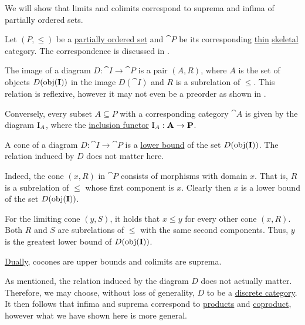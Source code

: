 \begin{example}\label{ex:limits_of_partially_ordered_set}
  We will show that limits and colimits correspond to suprema and infima of partially ordered sets.

  Let \( (P, \leq) \) be a \hyperref[def:partially_ordered_set]{partially ordered set} and \( \cat{P} \) be its corresponding \hyperref[def:thin_category]{thin} \hyperref[def:skeletal_category]{skeletal} category. The correspondence is discussed in .

  The image of a diagram \( D: \cat{I} \to \cat{P} \) is a pair \( (A, R) \), where \( A \) is the set of objects \( D(\operatorname{obj}(\operatorname{\mathbf{I}})) \) in the image \( D(\cat{I}) \) and \( R \) is a subrelation of \( \leq \). This relation is reflexive, however it may not even be a preorder as shown in .

  Conversely, every subset \( A \subseteq P \) with a corresponding category \( \cat{A} \) is given by the diagram \( \operatorname{I}_A \), where the \hyperref[def:subcategory]{inclusion functor} \( \operatorname{I}_A: \operatorname{\mathbf{A}} \to \operatorname{\mathbf{P}} \).

  A cone of a diagram \( D: \cat{I} \to \cat{P} \) is a \hyperref[def:partially_ordered_set_extremal_points/upper_and_lower_bounds]{lower bound} of the set \( D(\operatorname{obj}(\operatorname{\mathbf{I}})) \). The relation induced by \( D \) does not matter here.

  Indeed, the cone \( (x, R) \) in \( \cat{P} \) consists of morphisms with domain \( x \). That is, \( R \) is a subrelation of \( \leq \) whose first component is \( x \). Clearly then \( x \) is a lower bound of the set \( D(\operatorname{obj}(\operatorname{\mathbf{I}})) \).

  For the limiting cone \( (y, S) \), it holds that \( x \leq y \) for every other cone \( (x, R) \). Both \( R \) and \( S \) are subrelations of \( \leq \) with the same second components. Thus, \( y \) is the greatest lower bound of \( D(\operatorname{obj}(\operatorname{\mathbf{I}})) \).

  \hyperref[thm:categorical_principle_of_duality]{Dually}, cocones are upper bounds and colimits are suprema.

  As mentioned, the relation induced by the diagram \( D \) does not actually matter. Therefore, we may choose, without loss of generality, \( D \) to be a \hyperref[def:discrete_category]{discrete category}. It then follows that infima and suprema correspond to \hyperref[def:discrete_category_limits]{products} and \hyperref[def:discrete_category_limits]{coproduct}, however what we have shown here is more general.
\end{example}


